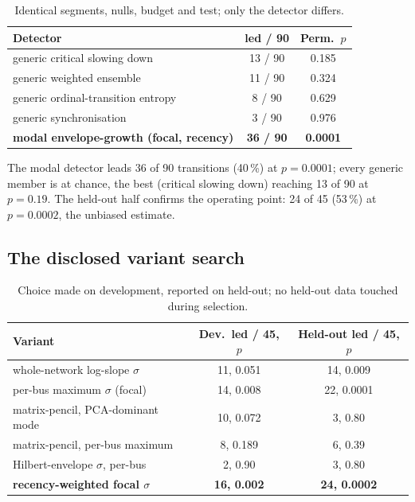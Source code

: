 \documentclass[journal]{IEEEtran}
\begin{document}
\begin{table}[h!]
\centering
\small
\setlength{\tabcolsep}{3.5pt}
\begin{tabular}{lcc}
\toprule
Detector & led / 90 & Perm.\ $p$ \\
\midrule
generic critical slowing down & 13 / 90 & 0.185 \\
generic weighted ensemble & 11 / 90 & 0.324 \\
generic ordinal-transition entropy & 8 / 90 & 0.629 \\
generic synchronisation & 3 / 90 & 0.976 \\
\textbf{modal envelope-growth (focal, recency)} & \textbf{36 / 90} & \textbf{0.0001} \\
\bottomrule
\end{tabular}
\caption{Identical segments, nulls, budget and test; only the detector
differs.}
\label{tab:headtohead}
\end{table}

The modal detector leads 36 of 90 transitions (40\,\%) at $p = 0.0001$;
every generic member is at chance, the best (critical slowing down)
reaching 13 of 90 at $p = 0.19$. The held-out half confirms the
operating point: 24 of 45 (53\,\%) at $p = 0.0002$, the unbiased
estimate.

\subsection{The disclosed variant search}\label{sec:variants}

\begin{table}[h!]
\centering
\scriptsize
\setlength{\tabcolsep}{3pt}
\begin{tabular}{lcc}
\toprule
Variant & Dev.\ led / 45, $p$ & Held-out led / 45, $p$ \\
\midrule
whole-network log-slope $\sigma$ & 11, 0.051 & 14, 0.009 \\
per-bus maximum $\sigma$ (focal) & 14, 0.008 & 22, 0.0001 \\
matrix-pencil, PCA-dominant mode & 10, 0.072 & 3, 0.80 \\
matrix-pencil, per-bus maximum & 8, 0.189 & 6, 0.39 \\
Hilbert-envelope $\sigma$, per-bus & 2, 0.90 & 3, 0.80 \\
\textbf{recency-weighted focal $\sigma$} & \textbf{16, 0.002} & \textbf{24, 0.0002} \\
\bottomrule
\end{tabular}
\caption{Choice made on development, reported on held-out; no held-out
data touched during selection.}
\label{tab:variants}
\end{table}
\end{document}
